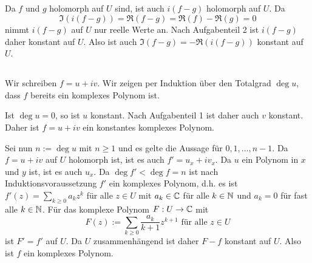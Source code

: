 \documentclass[a4paper,10pt]{article}
\begin{document}
\addtocounter{subsection}{-2}
\subsection{}
Da $f$ und $g$ holomorph auf $U$ sind, ist auch $i(f-g)$ holomorph auf $U$. Da
\[
 \Im(i(f-g)) = \Re(f-g) = \Re(f)-\Re(g) = 0
\]
nimmt $i(f-g)$ auf $U$ nur reelle Werte an. Nach Aufgabenteil 2 ist $i(f-g)$ daher konstant auf $U$. Also ist auch $\Im(f-g) = -\Re(i(f-g))$ konstant auf $U$.


\addtocounter{subsection}{1}
\subsection{}
Wir schreiben $f=u+iv$. Wir zeigen per Induktion über den Totalgrad $\deg u$, dass $f$ bereits ein komplexes Polynom ist.

Ist $\deg u = 0$, so ist $u$ konstant. Nach Aufgabenteil 1 ist daher auch $v$ konstant. Daher ist $f = u+iv$ ein konstantes komplexes Polynom.

Sei nun $n := \deg u$ mit $n \geq 1$ und es gelte die Aussage für $0,1,\ldots,n-1$. Da $f = u+iv$ auf $U$ holomorph ist, ist es auch $f' = u_x + i v_x$. Da $u$ ein Polynom in $x$ und $y$ ist, ist es auch $u_x$. Da $\deg f' < \deg f = n$ ist nach Induktionsvoraussetzung $f'$ ein komplexes Polynom, d.h. es ist $f'(z) = \sum_{k \geq 0} a_k z^k$ für alle $z \in U$ mit $a_k \in \mathbb{C}$ für alle $k \in \mathbb{N}$ und $a_k = 0$ für fast alle $k \in \mathbb{N}$. Für das komplexe Polynom $F : U \to \mathbb{C}$ mit
\[
 F(z) := \sum_{k \geq 0} \frac{a_k}{k+1} z^{k+1} \text{ für alle } z \in U
\]
ist $F' = f'$ auf $U$. Da $U$ zusammenhängend ist daher $F-f$ konstant auf $U$. Also ist $f$ ein komplexes Polynom.





\section{}
\end{document}
